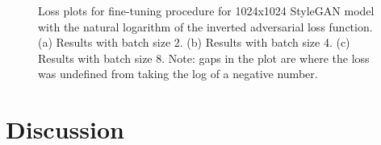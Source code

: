   \begin{figure}[!htbp]
    \centering
    \hfill
    \hfill
    \caption[Loss plots for fine-tuning procedure for 1024x1024 StyleGAN model with the natural logarithm of the inverted adversarial loss function]{Loss plots for fine-tuning procedure for 1024x1024 StyleGAN model with the natural logarithm of the inverted adversarial loss function. (a) Results with batch size 2. (b) Results with batch size 4. (c) Results with batch size 8. Note: gaps in the plot are where the loss was undefined from taking the log of a negative number.} 
    \label{fig:c4:1024-LOG-losses}
  \end{figure}

\FloatBarrier

\section{Discussion}

